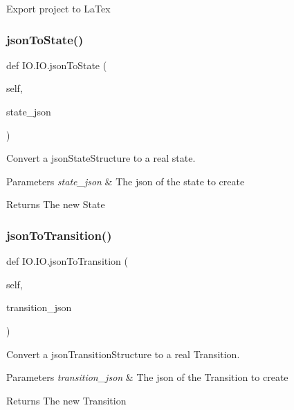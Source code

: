 \begin{DoxyVerb}Export project to LaTex\end{DoxyVerb}
 \mbox{\label{classIO_1_1IO_a556de6d0c4bbf2c5d2891607fe569efc}} 
\subsubsection{\texorpdfstring{jsonToState()}{jsonToState()}}
{\footnotesize\ttfamily def I\+O.\+I\+O.\+json\+To\+State (\begin{DoxyParamCaption}\item[{}]{self,  }\item[{}]{state\+\_\+json }\end{DoxyParamCaption})}



Convert a json\+State\+Structure to a real state. 


\begin{DoxyParams}{Parameters}
{\em state\+\_\+json} & The json of the state to create \\
\hline
\end{DoxyParams}
\begin{DoxyReturn}{Returns}
The new State 
\end{DoxyReturn}
\mbox{\label{classIO_1_1IO_a18ce7cd8a1b80106a9ecc5d1e6b55cab}} 
\subsubsection{\texorpdfstring{jsonToTransition()}{jsonToTransition()}}
{\footnotesize\ttfamily def I\+O.\+I\+O.\+json\+To\+Transition (\begin{DoxyParamCaption}\item[{}]{self,  }\item[{}]{transition\+\_\+json }\end{DoxyParamCaption})}



Convert a json\+Transition\+Structure to a real Transition. 


\begin{DoxyParams}{Parameters}
{\em transition\+\_\+json} & The json of the Transition to create \\
\hline
\end{DoxyParams}
\begin{DoxyReturn}{Returns}
The new Transition 
\end{DoxyReturn}
\mbox{\label{classIO_1_1IO_ae3b4bcb49eeb2b09deeb5e79c53e504f}} 
